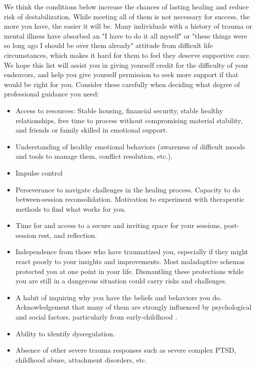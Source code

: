 \documentclass[12pt,letterpaper]{book}
\begin{document}
We think the conditions below increase the chances of lasting healing and reduce risk of destabilization. While meeting all of them is not necessary for success, the more you have, the easier it will be. Many individuals with a history of trauma or mental illness have absorbed an "I have to do it all myself" or "these things were so long ago I should be over them already" attitude from difficult life circumstances, which makes it hard for them to feel they deserve supportive care. We hope this list will assist you in giving yourself credit for the difficulty of your endeavors, and help you give yourself permission to seek more support if that would be right for you. Consider these carefully when deciding what degree of professional guidance you need:
\begin{itemize}
    \item Access to resources: Stable housing, financial security, stable healthy relationships, free time to process without compromising material stability, and friends or family skilled in emotional support.
    \item Understanding of healthy emotional behaviors (awareness of difficult moods and tools to manage them, conflict resolution, etc.).
    \item Impulse control
    \item Perseverance to navigate challenges in the healing process. Capacity to do between-session reconsolidation. Motivation to experiment with therapeutic methods to find what works for you.
    \item Time for and access to a secure and inviting space for your sessions, post-session rest, and reflection.
    \item Independence from those who have traumatized you, especially if they might react poorly to your insights and improvements. Most maladaptive schemas protected you at one point in your life. Dismantling these protections while you are still in a dangerous situation could carry risks and challenges.
    \item A habit of inquiring why you have the beliefs and behaviors you do. Acknowledgement that many of them are strongly influenced by psychological and social factors, particularly from early-childhood \cite{brownAttachmentDisturbances}.
    \item Ability to identify dysregulation.
    \item Absence of other severe trauma responses such as severe complex PTSD, childhood abuse, attachment disorders, etc.
\end{itemize}
\end{document}
